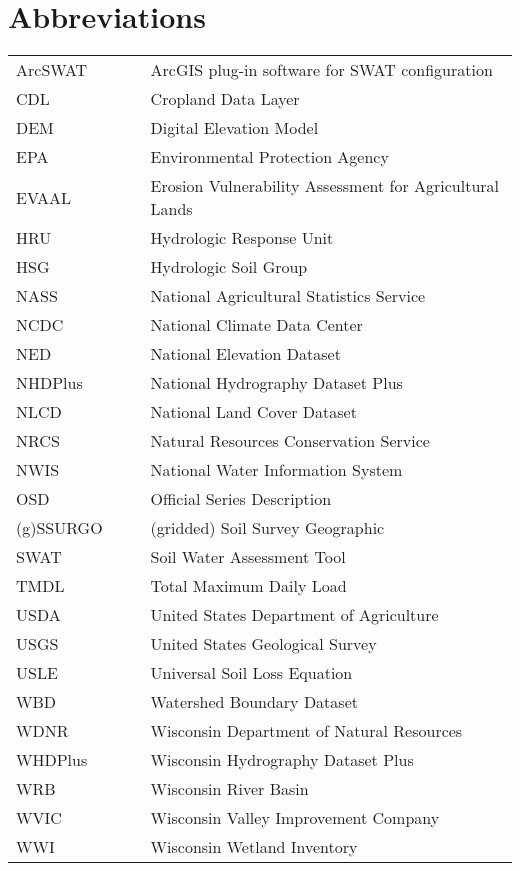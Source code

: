\section*{Abbreviations}

\begin{tabular}{l c c l}

ArcSWAT &   & & ArcGIS plug-in software for SWAT configuration \\
CDL		&	& &	Cropland Data Layer				\\
DEM		&	& &	Digital Elevation Model			\\
EPA		&	& &	Environmental Protection Agency	\\
EVAAL	&	& & Erosion Vulnerability Assessment for Agricultural Lands \\
HRU 	& 	& &	Hydrologic Response Unit 		\\
HSG		&	& &	Hydrologic Soil Group			\\
NASS	&	& &	National Agricultural Statistics Service \\
NCDC	&	& &	National Climate Data Center \\
NED     &   & & National Elevation Dataset \\
NHDPlus &   & & National Hydrography Dataset Plus \\
NLCD	&	& &	National Land Cover Dataset	\\
NRCS	& 	& &	Natural Resources Conservation Service \\
NWIS	&	& &	National Water Information System \\
OSD		&	& &	Official Series Description \\
(g)SSURGO	& & &	(gridded) Soil Survey Geographic \\
SWAT 	& 	& &	Soil Water Assessment Tool 		\\
TMDL	&	& &	Total Maximum Daily Load		\\
USDA	&	& &	United States Department of Agriculture\\
USGS 	&	& &	United States Geological Survey \\
USLE	&	& &	Universal Soil Loss Equation	\\
WBD		&	& &	Watershed Boundary Dataset		\\
WDNR	&	& &	Wisconsin Department of Natural Resources \\
WHDPlus	&	& &	Wisconsin Hydrography Dataset Plus \\
WRB		&	& &	Wisconsin River Basin			\\
WVIC	&	& &	Wisconsin Valley Improvement Company \\
WWI		&	& &	Wisconsin Wetland Inventory		\\
\end{tabular}

\clearpage